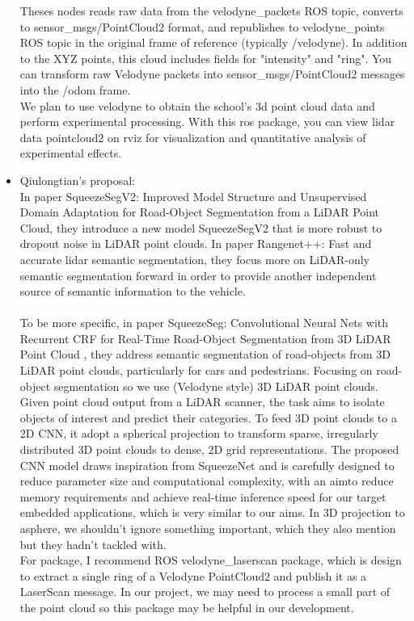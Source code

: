 \documentclass{article}
\begin{document}
\begin{normalsize}
\begin{itemize}
Theses nodes reads raw data from the velodyne\_packets ROS topic, converts to sensor\_msgs/PointCloud2 format, and republishes to velodyne\_points ROS topic in the original frame of reference (typically /velodyne). In addition to the XYZ points, this cloud includes fields for "intensity" and "ring".
You can transform raw Velodyne packets into sensor\_msgs/PointCloud2 messages into the /odom frame.\\
We plan to use velodyne to obtain the school’s 3d point cloud data and perform experimental processing. With this ros package, you can view lidar data pointcloud2 on rviz for visualization and quantitative analysis of experimental effects.\\
\item Qiulongtian's proposal:\\
In paper SqueezeSegV2: Improved Model Structure and Unsupervised Domain 
Adaptation for Road-Object Segmentation from a LiDAR Point Cloud, they introduce a new model SqueezeSegV2 that is more robust to dropout noise in LiDAR point clouds. In paper Rangenet++: Fast and accurate lidar semantic segmentation, they focus  more on LiDAR-only semantic segmentation forward in order to provide another independent source of semantic information to the vehicle. 
\\\\
To be more specific, in paper SqueezeSeg: Convolutional Neural Nets with Recurrent CRF for Real-Time Road-Object Segmentation from 3D LiDAR Point Cloud , they address  semantic segmentation of road-objects from 3D LiDAR point clouds, particularly for cars and pedestrians. Focusing on road-object segmentation so we use (Velodyne style) 3D LiDAR point clouds. Given point cloud output from a LiDAR scanner, the task aims to isolate objects of interest and predict their categories. To feed 3D point clouds to a 2D CNN, it adopt a spherical projection to 
transform sparse, irregularly distributed 3D point clouds to dense, 2D grid representations. The proposed CNN model draws inspiration from SqueezeNet  and is carefully designed to reduce parameter size and computational complexity, with an aimto reduce memory requirements and achieve real-time inference speed for our target embedded applications, which is very similar to our aims. In 3D projection to asphere, we shouldn’t ignore something important, which they also mention but they hadn’t tackled with.
\\
For package, I recommend ROS velodyne\_laserscan package, which is design to extract a single ring of a Velodyne PointCloud2 and publish it as a LaserScan message. In our project, we may need to process a small part of the point cloud so this package may be helpful in our development.

\end{itemize}
\end{normalsize}
\end{document}
